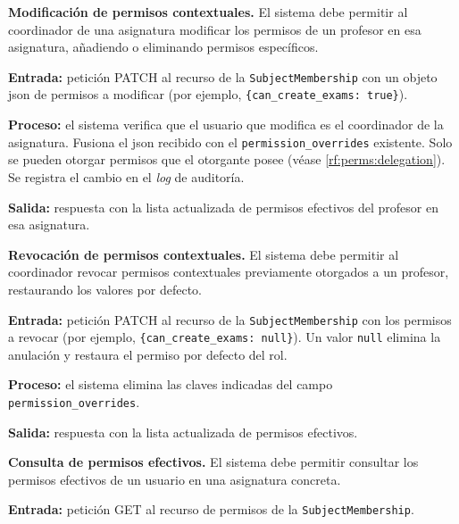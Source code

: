 \begin{functional}
    \item \textbf{Modificación de permisos contextuales.}
    \label{rf:perms:override}
    El sistema debe permitir al coordinador de una asignatura modificar los permisos de un
    profesor en esa asignatura, añadiendo o eliminando permisos específicos.

    \textbf{Entrada:} petición PATCH al recurso de la \texttt{SubjectMembership} con un
    objeto \acs{json} de permisos a modificar (por ejemplo,
    \texttt{\{can\_create\_exams: true\}}).

    \textbf{Proceso:} el sistema verifica que el usuario que modifica es el coordinador de
    la asignatura. Fusiona el \acs{json} recibido con el
    \texttt{permission\_overrides} existente. Solo se pueden otorgar permisos que el
    otorgante posee (véase \cref{rf:perms:delegation}). Se registra el cambio en el
    \textit{log} de auditoría.

    \textbf{Salida:} respuesta con la lista actualizada de permisos efectivos del profesor
    en esa asignatura.

    \item \textbf{Revocación de permisos contextuales.} \label{rf:perms:revoke}
    El sistema debe permitir al coordinador revocar permisos contextuales previamente
    otorgados a un profesor, restaurando los valores por defecto.

    \textbf{Entrada:} petición PATCH al recurso de la \texttt{SubjectMembership} con los
    permisos a revocar (por ejemplo, \texttt{\{can\_create\_exams: null\}}). Un valor
    \texttt{null} elimina la anulación y restaura el permiso por defecto del rol.

    \textbf{Proceso:} el sistema elimina las claves indicadas del campo
    \texttt{permission\_overrides}.

    \textbf{Salida:} respuesta con la lista actualizada de permisos efectivos.

    \item \textbf{Consulta de permisos efectivos.} \label{rf:perms:query}
    El sistema debe permitir consultar los permisos efectivos de un usuario en una
    asignatura concreta.

    \textbf{Entrada:} petición GET al recurso de permisos de la \texttt{SubjectMembership}.


\end{functional}
